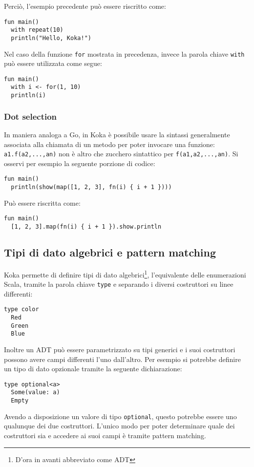 Perciò, l'esempio precedente può essere riscritto come:
\begin{lstlisting}[language=koka]
fun main()
  with repeat(10)
  println("Hello, Koka!")
\end{lstlisting}

Nel caso della funzione \lstinline{for} mostrata in precedenza, invece la parola chiave \lstinline{with} può essere utilizzata come segue:
\begin{lstlisting}[language=koka]
fun main()
  with i <- for(1, 10)
  println(i)
\end{lstlisting}

\subsubsection{Dot selection}
In maniera analoga a Go, in Koka è possibile usare la sintassi generalmente associata alla chiamata di un metodo per poter invocare una funzione: \lstinline{a1.f(a2,...,an)} non è altro che zucchero sintattico per \lstinline{f(a1,a2,...,an)}.
Si osservi per esempio la seguente porzione di codice:
\begin{lstlisting}[language=koka]
fun main()
  println(show(map([1, 2, 3], fn(i) { i + 1 })))
\end{lstlisting}
Può essere riscritta come:
\begin{lstlisting}[language=koka]
fun main()
  [1, 2, 3].map(fn(i) { i + 1 }).show.println
\end{lstlisting}

\subsection{Tipi di dato algebrici e pattern matching}
Koka permette di definire tipi di dato algebrici\footnote{D'ora in avanti abbreviato come ADT}, l'equivalente delle enumerazioni Scala, tramite la parola chiave \lstinline{type} e separando i diversi costruttori su linee differenti:
\begin{lstlisting}[language=koka]
type color
  Red
  Green
  Blue
\end{lstlisting}
Inoltre un ADT può essere parametrizzato su tipi generici e i suoi costruttori possono avere campi differenti l'uno dall'altro. Per esempio si potrebbe definire un tipo di dato opzionale tramite la seguente dichiarazione:
\begin{lstlisting}[language=koka]
type optional<a>
  Some(value: a)
  Empty
\end{lstlisting}
Avendo a disposizione un valore di tipo \lstinline{optional}, questo potrebbe essere uno qualunque dei due costruttori. L'unico modo per poter determinare quale dei costruttori sia e accedere ai suoi campi è tramite pattern matching.

